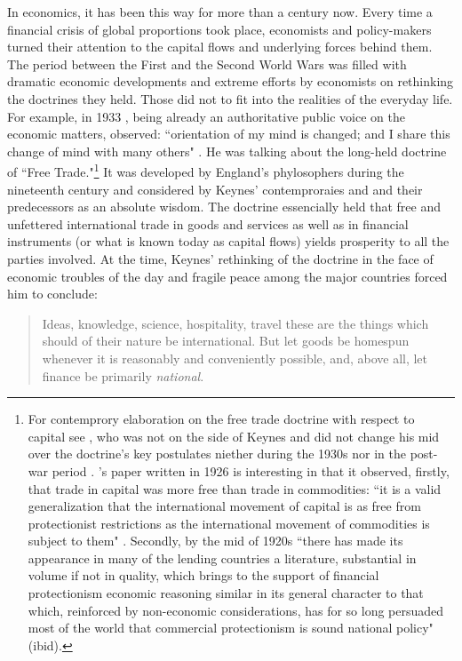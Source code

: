 In economics, it has been this way for more than a century now. Every time a financial crisis of global proportions took place, economists and policy-makers turned their attention to the capital flows and underlying forces behind them. The period between the First and the Second World Wars was filled with dramatic economic developments and extreme efforts by economists on rethinking the doctrines they held. Those did not to fit into the realities of the everyday life. For example, in 1933 \citeauthor{keynes1933}, being already an authoritative public voice on the economic matters, observed: ``orientation of my mind is changed; and I share this change of mind with many others" \citep[p.~177]{keynes1933}. He was talking about the long-held doctrine of ``Free Trade."\footnote{For contemprory elaboration on the free trade doctrine with respect to capital see \cite{viner1926}, who was not on the side of Keynes and did not change his mid over the doctrine's key postulates niether during the 1930s nor in the post-war period \citep{viner1947}. \citeauthor{viner1926}'s paper written in 1926 is interesting in that it observed, firstly, that trade in capital was more free than trade in commodities: ``it is a valid generalization that the international movement of capital is as free from protectionist restrictions as the international movement of commodities is subject to them" \citep[p.~40]{viner1926}. Secondly, by the mid of 1920s ``there has made its appearance in many of the lending countries a literature, substantial in volume if not in quality, which brings to the support of financial protectionism economic reasoning similar in its general character to that which, reinforced by non-economic considerations, has for so long persuaded most of the world that commercial protectionism is sound national policy" (ibid).} It was developed by England's phylosophers during the nineteenth century and considered by Keynes' contemproraies and and their predecessors as an absolute wisdom. The doctrine essencially held that free and unfettered international trade in goods and services as well as in financial instruments (or what is known today as capital flows) yields prosperity to all the parties involved. At the time, Keynes' rethinking of the doctrine in the face of economic troubles of the day and fragile peace among the major countries forced him to  conclude:

\begin{quote}
Ideas, knowledge, science, hospitality, travel these are the things which should of their nature be international. But let goods be homespun whenever it is reasonably and conveniently possible, and, above all, let finance be primarily \textit{national}. \citep[p.~181, emphasis added]{keynes1933}
\end{quote}


